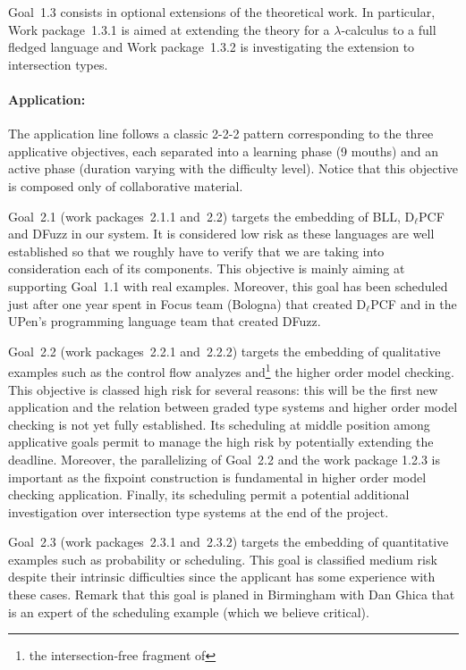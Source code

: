 \documentclass{article}[11pt]
\newcommand\BLL{BLL\xspace}
\newcommand\DlPCF{D$_\ell$PCF\xspace}
\newcommand\DFuzz{DFuzz\xspace}
\begin{document}
Goal~1.3 consists in optional extensions of the theoretical work. In particular, Work package~1.3.1 is aimed at extending the theory for a $\lambda$-calculus to a full fledged language and Work package~1.3.2 is investigating the extension to intersection types.



\paragraph{Application:}
The application line follows a classic 2-2-2 pattern corresponding to the three applicative objectives, each separated into a learning phase (9 mouths) and an active phase (duration varying with the difficulty level). Notice that this objective is composed only of collaborative material.

Goal~2.1 (work packages~2.1.1 and~2.2) targets the embedding of \BLL, \DlPCF and \DFuzz in our system. It is considered low risk as these languages are well established so that we roughly have to verify that we are taking into consideration each of its components. This objective is mainly aiming at supporting Goal~1.1 with real examples. Moreover, this goal has been scheduled just after one year spent in Focus team (Bologna) that created \DlPCF and in the UPen's programming language team that created \DFuzz.

Goal~2.2 (work packages~2.2.1 and~2.2.2) targets the embedding of qualitative examples such as the control flow analyzes and\footnote{the intersection-free fragment of} the higher order model checking. This objective is classed high risk for several reasons: this will be the first new application and the relation between graded type systems and higher order model checking is not yet fully established. Its scheduling at middle position among applicative goals permit to manage the high risk by potentially extending the deadline. Moreover, the parallelizing of Goal~2.2 and the work package 1.2.3 is important as the fixpoint construction is fundamental in higher order model checking application. Finally, its scheduling permit a potential additional investigation over intersection type systems at the end of the project.

Goal~2.3 (work packages~2.3.1 and~2.3.2) targets the embedding of quantitative examples such as probability or scheduling. This goal is classified medium risk despite their intrinsic difficulties since the applicant has some experience with these cases. Remark that this goal is planed in Birmingham with Dan Ghica that is an expert of the scheduling example (which we believe critical).
\end{document}
